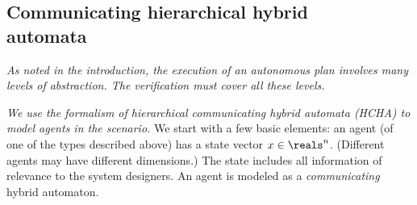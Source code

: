 \subsection{Communicating hierarchical hybrid \\automata}
\label{HCHA}
{\it As noted in the introduction, the execution of an autonomous plan involves many levels of abstraction. The verification must cover all these levels.}

{\it We use the formalism of hierarchical  communicating hybrid automata (HCHA) to model agents in the scenario. }
We start with a few basic elements:
an agent (of one of the types described above) has a state vector $\stPt \in \reals^n$.
(Different agents may have different dimensions.)
The state includes all information of relevance to the system designers.%
An agent is modeled as a \emph{communicating} hybrid automaton.

